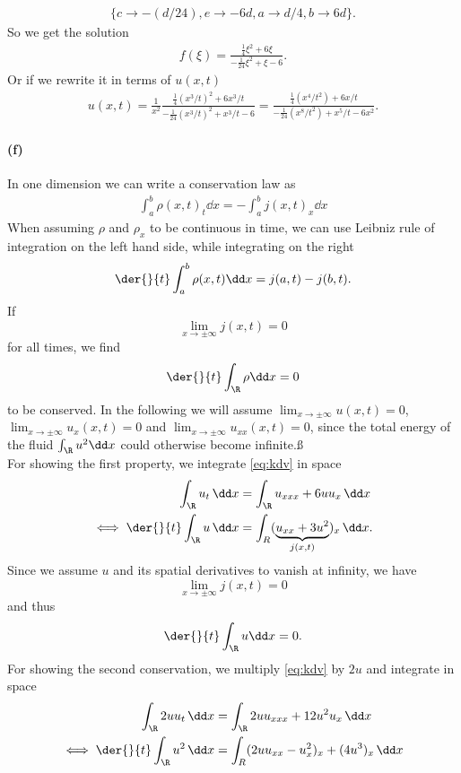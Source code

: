 \begin{align}
\{c \rightarrow -(d/24), e \rightarrow -6 d, a \rightarrow d/4, b \rightarrow 6 d\}.
\end{align}
So we get the solution
\begin{align}
f(\xi) = \frac{\frac 14\xi^2+6\xi}{-\frac{1}{24}\xi^2+\xi-6}.
\end{align}
Or if we rewrite it in terms of $u(x,t)$
\begin{align}
u(x,t)=\frac{1}{x^2}\frac{\frac 14(x^3/t)^2+6x^3/t}{-\frac{1}{24}(x^3/t)^2+x^3/t-6} =\frac{\frac 14(x^4/t^2)+6x/t}{-\frac{1}{24}(x^8/t^2)+x^5/t-6x^2}.
\end{align}
\paragraph{(f)}
In one dimension we can write a conservation law as
\begin{align}
\int_a^b\rho(x,t)_t\dd x=-\int_a^b j(x,t)_x\dd x
\end{align}
When assuming $\rho$ and $\rho_x$ to be continuous in time, we can use Leibniz rule of integration on the left hand side, while integrating on the right
\begin{align}
\der{}{t}\int_a^b\rho(x,t) \dd x= j(a,t)-j(b,t).
\end{align}
If \[\lim_{x\to\pm\infty} j (x,t)= 0\] for all times, we find
\begin{align}
\der{}{t}\int_\R \rho \dd x = 0
\end{align}
to be conserved.
In the following we will assume $\lim_{x\to\pm\infty}u(x,t)=0$, $\lim_{x\to\pm\infty}u_x(x,t)=0$ and $\lim_{x\to\pm\infty}u_{xx}(x,t)=0$, since the total energy of the fluid $\int_\R u^2\dd x$ could otherwise become infinite.ß\\
For showing the first property, we integrate \cref{eq:kdv} in space
\begin{align}
\int_\R u_t \,\dd x&= \int_\R u_{xxx} +6uu_x\,\dd x\\
\iff \der{}{t} \int_\R u \,\dd x & = \int_R (\underbrace{u_{xx} + 3 u^2}_{j(x,t)})_x\, \dd x.
\end{align} 
Since we assume $u$ and its spatial derivatives to vanish at infinity, we have \[\lim_{x\to\pm\infty} j (x,t)= 0\] and thus
\begin{align}
\der{}{t} \int_\R u \dd x = 0.
\end{align}
For showing the second conservation, we multiply \cref{eq:kdv} by $2u$ and integrate in space
\begin{align}
\int_\R2 uu_t\,\dd x & = \int_\R 2uu_{xxx} +12u^2u_x \, \dd x\\
\iff\der{}{t}\int_\R u^2\, \dd x&= \int_R (2uu_{xx}-u_x^2)_x + (4u^3)_x\,\dd x
\end{align}
